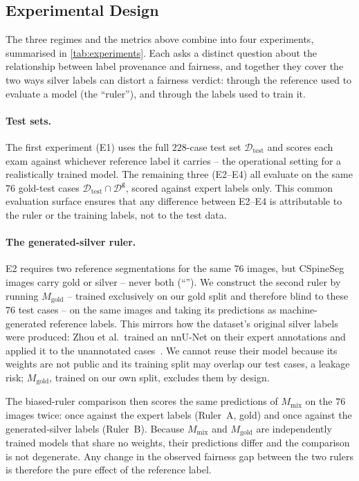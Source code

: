 \subsection{Experimental Design}
\label{sec:design}

The three regimes and the metrics above combine into four experiments, summarised
in \autoref{tab:experiments}. Each asks a distinct question about the relationship
between label provenance and fairness, and together they cover the two ways silver
labels can distort a fairness verdict: through the reference used to evaluate
a model (the ``ruler''), and through the labels used to train it.

\paragraph{Test sets.}
The first experiment (E1) uses the full $228$-case test set
$\mathcal{D}_{\mathrm{test}}$ and scores each exam against whichever reference
label it carries -- the operational setting for a realistically trained model. The
remaining three (E2--E4) all evaluate on the same $76$ gold-test cases
$\mathcal{D}_{\mathrm{test}} \cap \mathcal{D}^{\mathsf{g}}$, scored against expert
labels only. This common evaluation surface ensures that any difference between
E2--E4 is attributable to the ruler or the training labels, not to the test data.

\paragraph{The generated-silver ruler.}
E2 requires two reference segmentations for the same $76$ images, but CSpineSeg
images carry gold or silver -- never both
(``''). We construct the second ruler by running
$M_{\mathrm{gold}}$ -- trained exclusively on our gold split and therefore blind to
these $76$ test cases -- on the same images and taking its predictions as
machine-generated reference labels. This mirrors how the dataset's original silver
labels were produced: Zhou et al.\ trained an nnU-Net on their expert annotations
and applied it to the unannotated cases~\cite{zhou2025cspineseg}. We cannot reuse
their model because its weights are not public and its training split may overlap
our test cases, a leakage risk; $M_{\mathrm{gold}}$, trained on our own split,
excludes them by design.

The biased-ruler comparison then scores the same predictions of
$M_{\mathrm{mix}}$ on the $76$ images twice: once against the expert labels
(Ruler~A, gold) and once against the generated-silver labels (Ruler~B). Because
$M_{\mathrm{mix}}$ and $M_{\mathrm{gold}}$ are independently trained models that
share no weights, their predictions differ and the comparison is not degenerate.
Any change in the observed fairness gap between the two rulers is therefore the
pure effect of the reference label.

